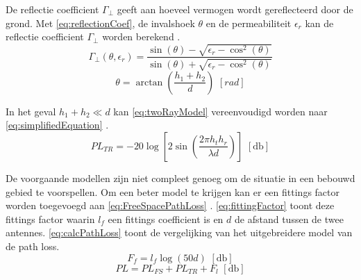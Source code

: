 De reflectie coefficient $\Gamma_\bot$ geeft aan hoeveel vermogen wordt gereflecteerd door de grond. Met \autoref{eq:reflectionCoef}, de invalshoek $\theta$ en de permeabiliteit $\epsilon_r$ kan de reflectie coefficient $\Gamma_\bot$ worden berekend \cite{bacco2014uavs,sommer2012applicability}.
\begin{equation}\label{eq:reflectionCoef}
    \Gamma_\bot\left(\theta, \epsilon_r\right)=\frac{\sin\left(\theta\right)-\sqrt{\epsilon_r-\cos^2\left(\theta\right)}}{\sin\left(\theta\right)+\sqrt{\epsilon_r-\cos^2\left(\theta\right)}}
\end{equation}
\begin{equation}
    \theta=\arctan\left(\frac{h_1+h_2}{d}\right)\,\,\unit{\left[rad\right]}
\end{equation}

In het geval $h_1+h_2\ll d$ kan \autoref{eq:twoRayModel} vereenvoudigd worden naar \autoref{eq:simplifiedEquation} \cite{brini2019system}.
\begin{equation}\label{eq:simplifiedEquation}
    PL_{TR}=-20\log\left[2\sin\left(\frac{2\pi h_th_r}{\lambda d}\right)\right] \,\,\left[\unit{\decibel}\right]
\end{equation}

De voorgaande modellen zijn niet compleet genoeg om de situatie in een bebouwd gebied te voorspellen. Om een beter model te krijgen kan er een fittings factor worden toegevoegd aan \autoref{eq:FreeSpacePathLoss} \cite[24]{brini2019system}. \autoref{eq:fittingFactor} toont deze fittings factor waarin \(l_f\) een fittings coefficient is en $d$ de afstand tussen de twee antennes. \autoref{eq:calcPathLoss} toont de vergelijking van het uitgebreidere model van de path loss.
\begin{equation} \label{eq:fittingFactor}
    F_f=l_f\log(50d) \,\,\left[\unit{\decibel}\right]
\end{equation}
\begin{equation}\label{eq:calcPathLoss}
    PL= PL_{FS}+PL_{TR}+F_l \,\,\left[\unit{\decibel}\right]
\end{equation}

